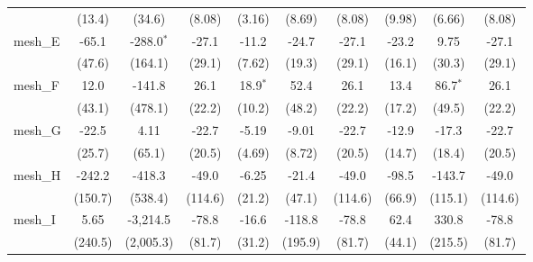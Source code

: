 \begin{tabular}{lccccccccc}
                                                               & (13.4)           & (34.6)          & (8.08)         & (3.16)        & (8.69)        & (8.08)         & (9.98)        & (6.66)        & (8.08)\\   
   mesh\_E                                                     & -65.1            & -288.0$^{*}$    & -27.1          & -11.2         & -24.7         & -27.1          & -23.2         & 9.75          & -27.1\\   
                                                               & (47.6)           & (164.1)         & (29.1)         & (7.62)        & (19.3)        & (29.1)         & (16.1)        & (30.3)        & (29.1)\\   
   mesh\_F                                                     & 12.0             & -141.8          & 26.1           & 18.9$^{*}$    & 52.4          & 26.1           & 13.4          & 86.7$^{*}$    & 26.1\\   
                                                               & (43.1)           & (478.1)         & (22.2)         & (10.2)        & (48.2)        & (22.2)         & (17.2)        & (49.5)        & (22.2)\\   
   mesh\_G                                                     & -22.5            & 4.11            & -22.7          & -5.19         & -9.01         & -22.7          & -12.9         & -17.3         & -22.7\\   
                                                               & (25.7)           & (65.1)          & (20.5)         & (4.69)        & (8.72)        & (20.5)         & (14.7)        & (18.4)        & (20.5)\\   
   mesh\_H                                                     & -242.2           & -418.3          & -49.0          & -6.25         & -21.4         & -49.0          & -98.5         & -143.7        & -49.0\\   
                                                               & (150.7)          & (538.4)         & (114.6)        & (21.2)        & (47.1)        & (114.6)        & (66.9)        & (115.1)       & (114.6)\\   
   mesh\_I                                                     & 5.65             & -3,214.5        & -78.8          & -16.6         & -118.8        & -78.8          & 62.4          & 330.8         & -78.8\\   
                                                               & (240.5)          & (2,005.3)       & (81.7)         & (31.2)        & (195.9)       & (81.7)         & (44.1)        & (215.5)       & (81.7)\\   

\end{tabular}
